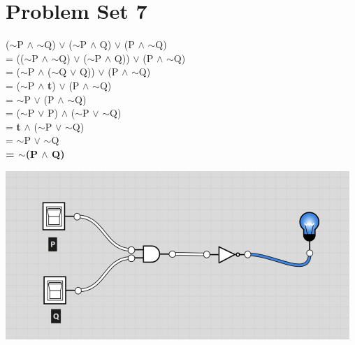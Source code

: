 \documentclass[12pt]{article}
\begin{document}
\newpage

\section*{Problem Set 7}
\begin{center}
    ($\sim$P $\wedge$ $\sim$Q) $\vee$ ($\sim$P $\wedge$ Q) $\vee$ (P $\wedge$ $\sim$Q) \\
    = (($\sim$P $\wedge$ $\sim$Q) $\vee$ ($\sim$P $\wedge$ Q)) $\vee$ (P $\wedge$ $\sim$Q) \\
    = ($\sim$P $\wedge$ ($\sim$Q $\vee$ Q)) $\vee$ (P $\wedge$ $\sim$Q) \\
    = ($\sim$P $\wedge$ {\bf t}) $\vee$ (P $\wedge$ $\sim$Q) \\
    = $\sim$P $\vee$ (P $\wedge$ $\sim$Q) \\
    = ($\sim$P $\vee$ P) $\wedge$ ($\sim$P $\vee$ $\sim$Q) \\
    = {\bf t} $\wedge$ ($\sim$P $\vee$ $\sim$Q) \\
    = $\sim$P $\vee$ $\sim$Q \\
    {\bf = $\sim$(P $\wedge$ Q)} \\

    \vspace{5em}

    \includegraphics[scale = 1]{circuit.png}
\end{center}
\end{document}

